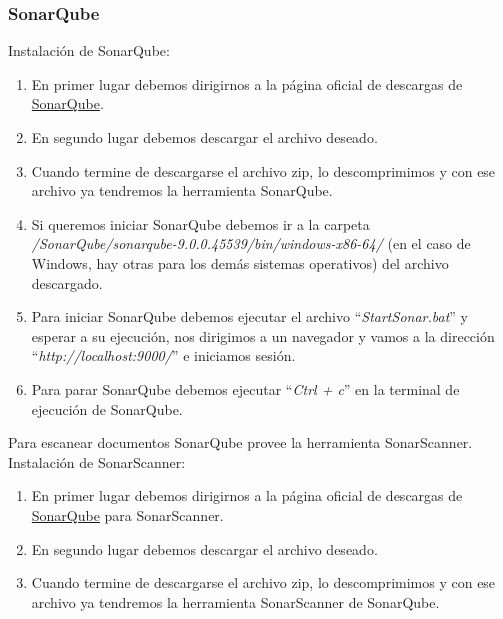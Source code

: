 \subsubsection{SonarQube}\label{sonarQubeInstall}

Instalación de SonarQube:

\begin{enumerate}
\item
	En primer lugar debemos dirigirnos a la página oficial de descargas de \href{https://www.sonarqube.org/downloads/}{SonarQube}.
\item
	En segundo lugar debemos descargar el archivo deseado.
\item 
	Cuando termine de descargarse el archivo zip, lo descomprimimos y con ese archivo ya tendremos la herramienta SonarQube.
\item 
	Si queremos iniciar SonarQube debemos ir a la carpeta \textit{/SonarQube/sonarqube-9.0.0.45539/bin/windows-x86-64/} (en el caso de Windows, hay otras para los demás sistemas operativos) del archivo descargado.
\item
	Para iniciar SonarQube debemos ejecutar el archivo ``\textit{StartSonar.bat}'' y esperar a su ejecución, nos dirigimos a un navegador y vamos a la dirección ``\textit{http://localhost:9000/}'' e iniciamos sesión.
\label{princiQube}
\item
	Para parar SonarQube debemos ejecutar ``\textit{Ctrl + c}'' en la terminal de ejecución de SonarQube.
\end{enumerate}

Para escanear documentos SonarQube provee la herramienta SonarScanner.\\
Instalación de SonarScanner:

\begin{enumerate}
\item
	En primer lugar debemos dirigirnos a la página oficial de descargas de \href{https://docs.sonarqube.org/latest/analysis/scan/sonarscanner/}{SonarQube} para SonarScanner.
\item
	En segundo lugar debemos descargar el archivo deseado.
\item 
	Cuando termine de descargarse el archivo zip, lo descomprimimos y con ese archivo ya tendremos la herramienta SonarScanner de SonarQube.
\end{enumerate}

